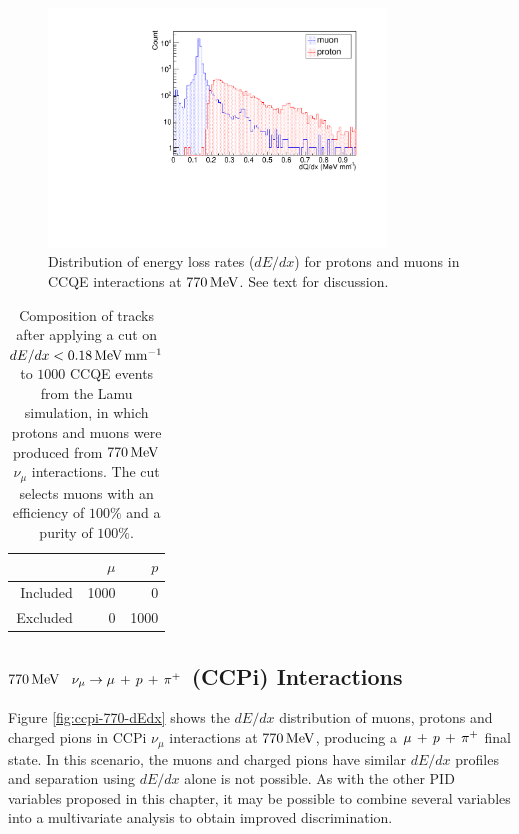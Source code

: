 \begin{figure}
    \centering
    \includegraphics[angle=-90,width=0.8\textwidth]{chapters/particleid_images/ccqe-770-dQdx}
    \caption[$dE/dx$ distribution for $\mu$, $p$ from $770\MeV$ $\nu_\mu$]{\label{fig:ccqe-770-dEdx}Distribution of energy loss rates ($dE/dx$) for protons and muons in \acs{CCQE} interactions at $770\MeV$. See text for discussion.}
\end{figure}

\begin{table}
    \centering
    \begin{tabular}{*{3}{r}}
        & $\mu$ & $p$ \\
        \hline
        \hline
        Included & 1000 & 0 \\
        Excluded & 0 & 1000 \\
        \hline
    \end{tabular}
    \caption[Composition of tracks after cut on $dE/dx$ for $770\MeV$ \acs{CCQE} events]{\label{table:ccqe-770-dedx-cut}Composition of tracks after applying a cut on $dE/dx < 0.18 \,\mathrm{MeV}\,\mathrm{mm}^{-1}$ to $1000$ \acs{CCQE} events from the Lamu simulation, in which protons and muons were produced from $770\MeV$ $\nu_\mu$ interactions. The cut selects muons with an efficiency of $100\%$ and a purity of $100\%$.}
\end{table}

\subsection{$770\MeV$ \texorpdfstring{$\nu_\mu \rightarrow \mu\,+\,p\,+\,\pi^{+}$}{ν\_μ → μ + p + π⁺} (\texorpdfstring{\acs{CCPi}}{CC1π}) Interactions}
Figure \ref{fig:ccpi-770-dEdx} shows the $dE/dx$ distribution of muons, protons and charged pions in \acs{CCPi} $\nu_\mu$ interactions at $770\MeV$, producing a $\mu\,+\,p\,+\,\pi^{+}$ final state. In this scenario, the muons and charged pions have similar $dE/dx$ profiles and separation using $dE/dx$ alone is not possible. As with the other PID variables proposed in this chapter, it may be possible to combine several variables into a multivariate analysis to obtain improved discrimination.

